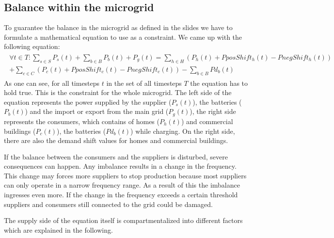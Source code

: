 \subsection{Balance within the microgrid}
To guarantee the balance in the microgrid as defined in the slides we have to formulate a mathematical equation to use as a constraint.
We came up with the following equation:\\
\begin{align} \label{eq1:balance}
\begin{split}
\forall t \in T: \sum\limits_{s \in S}{P_{s}(t)} + \sum\limits_{b \in B}{P_{b}(t)} + P_{g}(t) = \sum_{h \in H}({P_{h}(t)} + PposShift_h(t) - PnegShift_h(t))
\\ + \sum_{c \in C}({P_{c}(t)} + PposShift_c(t) - PnegShift_c(t)) - \sum\limits_{b \in B}{Pd_{b}(t)}
\end{split}
\end{align}
As one can see, for all timesteps $t$ in the set of all timesteps $T$ the equation has to hold true. 
This is the constraint for the whole microgrid. 
The left side of the equation represents the power supplied by the supplier ($P_{s}(t)$), the batteries ($P_{b}(t)$) and the import or export from the main grid ($P_{g}(t)$), the right side represents the consumers, which contains of homes ($P_{h}(t)$) and commercial buildings ($P_{c}(t)$), the batteries ($Pd_{b}(t)$) while charging. 
On the right side, there are also the demand shift values for homes and commercial buildings.

If the balance between the consumers and the suppliers is disturbed, severe consequences can happen. 
Any imbalance results in a change in the frequency. 
This change may forces more suppliers to stop production because most suppliers can only operate in a narrow frequency range. 
As a result of this the imbalance ingresses even more. 
If the change in the frequency exceeds a certain threshold suppliers and consumers still connected to the grid could be damaged. 

The supply side of the equation itself is compartmentalized into different factors which are explained in the following.

